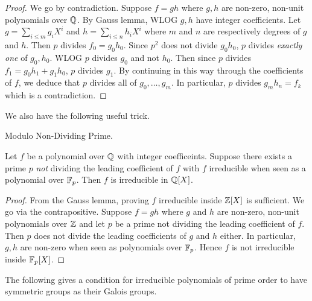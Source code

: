 \documentclass[../book.tex]{subfiles}
\begin{document}
\begin{proof}
    
    We go by contradiction. 
    Suppose $f = gh$ where $g, h$ are non-zero, non-unit polynomials over $\mathbb{Q}$. 
    By Gauss lemma, WLOG $g, h$ have integer coefficients. 
    Let $g = \sum_{i \leq m} g_i X^i$ and $h = \sum_{i \leq n} h_i X^i$
    where $m$ and $n$ are respectively degrees of $g$ and $h$. 
    Then $p$ divides $f_0 = g_0 h_0$. 
    Since $p^2$ does not divide $g_0 h_0$, 
    $p$ divides \emph{exactly one} of $g_0, h_0$.
    WLOG $p$ divides $g_0$ and not $h_0$. 
    Then since $p$ divides $f_1 = g_0 h_1 + g_1 h_0$, $p$ divides $g_1$.
    By continuing in this way through the coefficients of $f$,
    we deduce that $p$ divides all of $g_0, \dots, g_m$. 
    In particular, $p$ divides $g_m h_n = f_k$ which is a contradiction. 
    
\end{proof}

We also have the following useful trick. 

\begin{thm} Modulo Non-Dividing Prime. 
    
    Let $f$ be a polynomial over $\mathbb{Q}$ with integer coefficeints. 
    Suppose there exists a prime $p$ 
    \emph{not} dividing the leading coefficient of $f$
    with $f$ irreducible when seen as a polynomial over $\mathbb{F}_p$. 
    Then $f$ is irreducible in $\mathbb{Q}[X]$. 
    
\end{thm}
\begin{proof}
    
    From the Gauss lemma, proving $f$ irreducible inside $\mathbb{Z}[X]$ is sufficient. 
    We go via the contrapositive. 
    Suppose $f = gh$ where $g$ and $h$ are non-zero, non-unit polynomials over $\mathbb{Z}$
    and let $p$ be a prime not dividing the leading coefficient of $f$.
    Then $p$ does not divide the leading coefficients of $g$ and $h$ either. 
    In particular, $g, h$ are non-zero when seen as polynomials over $\mathbb{F}_p$. 
    Hence $f$ is not irreducible inside $\mathbb{F}_p[X]$.
    
\end{proof}

The following gives a condition for irreducible polynomials of prime order
to have symmetric groups as their Galois groups.
\end{document}
